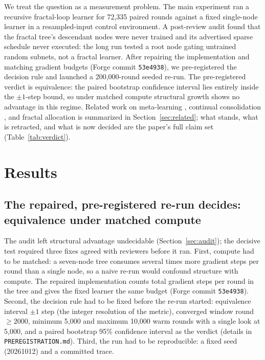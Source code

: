 \documentclass[11pt]{article}
\begin{document}
We treat the question as a measurement problem. The main experiment ran a recursive fractal-loop learner for 72,335 paired rounds against a fixed single-node learner in a resampled-input control environment. A post-review audit found that the fractal tree's descendant nodes were never trained and its advertised sparse schedule never executed: the long run tested a root node gating untrained random subnets, not a fractal learner. After repairing the implementation and matching gradient budgets (Forge commit \texttt{53e4938}), we pre-registered the decision rule and launched a 200,000-round seeded re-run. The pre-registered verdict is equivalence: the paired bootstrap confidence interval lies entirely inside the $\pm 1$-step bound, so under matched compute structural growth shows no advantage in this regime. Related work on meta-learning \cite{Finn2017,Li2017}, continual consolidation \cite{Kirkpatrick2017}, and fractal allocation \cite{Murray1926,LmPrincipleFractal} is summarized in Section~\ref{sec:related}; what stands, what is retracted, and what is now decided are the paper's full claim set (Table~\ref{tab:verdict}).

\section{Results}

\subsection{The repaired, pre-registered re-run decides: equivalence under matched compute}

The audit left structural advantage undecidable (Section~\ref{sec:audit}); the decisive test required three fixes agreed with reviewers before it ran. First, compute had to be matched: a seven-node tree consumes several times more gradient steps per round than a single node, so a naive re-run would confound structure with compute. The repaired implementation counts total gradient steps per round in the tree and gives the fixed learner the same budget (Forge commit \texttt{53e4938}). Second, the decision rule had to be fixed before the re-run started: equivalence interval $\pm 1$ step (the integer resolution of the metric), converged window round $\ge 2000$, minimum 5,000 and maximum 10,000 warm rounds with a single look at 5,000, and a paired bootstrap 95\% confidence interval as the verdict (details in \texttt{PREREGISTRATION.md}). Third, the run had to be reproducible: a fixed seed (20261012) and a committed trace.
\end{document}

